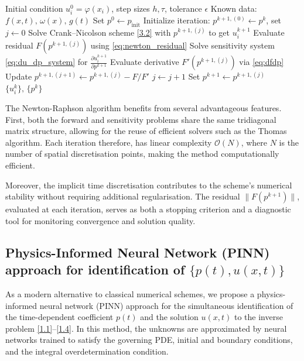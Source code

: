 \documentclass[reqno]{amsart}
\begin{document}
\begin{algorithm}[H]
\caption{Newton--Raphson method for identifying \( \{p(t), u(x,t)\} \)}
\label{alg:newton}
\begin{algorithmic}[1]
\Require Initial condition \( u_i^0 = \varphi(x_i) \), step sizes \( h, \tau \), tolerance \( \epsilon \)
\Require Known data: \( f(x,t),\, \omega(x),\, g(t) \)
\State Set \( p^0 \gets p_{\text{init}} \)
    \State Initialize iteration: \( p^{k+1,(0)} \gets p^k \), set \( j \gets 0 \)
    \Repeat
        \State Solve Crank--Nicolson scheme \eqref{3.2} with \( p^{k+1,(j)} \) to get \( u_i^{k+1} \)
        \State Evaluate residual \( F(p^{k+1,(j)}) \) using \eqref{eq:newton_residual}
        \State Solve sensitivity system \eqref{eq:du_dp_system} for \( \frac{\partial u_i^{k+1}}{\partial p^{k+1}} \)
        \State Evaluate derivative \( F'(p^{k+1,(j)}) \) via \eqref{eq:dfdp}
        \State Update \( p^{k+1,(j+1)} \gets p^{k+1,(j)} - F / F' \)
        \State \( j \gets j + 1 \)
    \State Set \( p^{k+1} \gets p^{k+1,(j)} \)
\EndFor
\State \Return \( \{ u_i^k \},\, \{ p^k \} \)
\end{algorithmic}
\end{algorithm}
\begin{remark}
The Newton-Raphson algorithm benefits from several advantageous features. First, both the forward and sensitivity problems share the same tridiagonal matrix structure, allowing for the reuse of efficient solvers such as the Thomas algorithm. Each iteration therefore, has linear complexity \( \mathcal{O}(N) \), where \( N \) is the number of spatial discretisation points, making the method computationally efficient.

Moreover, the implicit time discretisation contributes to the scheme's numerical stability without requiring additional regularisation. The residual \( \|F(p^{k+1})\| \), evaluated at each iteration, serves as both a stopping criterion and a diagnostic tool for monitoring convergence and solution quality.
\end{remark}

\subsection{Physics-Informed Neural Network (PINN) approach for identification of \texorpdfstring{$\{p(t), u(x,t)\}$}{p(t), u(x,t)}}

As a modern alternative to classical numerical schemes, we propose a physics-informed neural network (PINN) approach for the simultaneous identification of the time-dependent coefficient \( p(t) \) and the solution \( u(x,t) \) to the inverse problem \eqref{1.1}--\eqref{1.4}. In this method, the unknowns are approximated by neural networks trained to satisfy the governing PDE, initial and boundary conditions, and the integral overdetermination condition.
\end{document}
